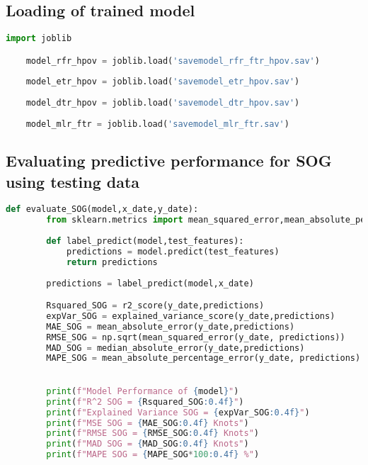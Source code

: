\subsection*{Loading of trained model}

\begin{lstlisting}[language=Python]
    import joblib

    model_rfr_hpov = joblib.load('savemodel_rfr_ftr_hpov.sav')
    
    model_etr_hpov = joblib.load('savemodel_etr_hpov.sav')
    
    model_dtr_hpov = joblib.load('savemodel_dtr_hpov.sav')
    
    model_mlr_ftr = joblib.load('savemodel_mlr_ftr.sav')       
\end{lstlisting}

\subsection*{Evaluating predictive performance for SOG using testing data}

\begin{lstlisting}[language=Python]
    def evaluate_SOG(model,x_date,y_date):
        from sklearn.metrics import mean_squared_error,mean_absolute_percentage_error,r2_score,explained_variance_score,median_absolute_error,mean_absolute_error
        
        def label_predict(model,test_features):
            predictions = model.predict(test_features)
            return predictions
        
        predictions = label_predict(model,x_date)

        Rsquared_SOG = r2_score(y_date,predictions)
        expVar_SOG = explained_variance_score(y_date,predictions)
        MAE_SOG = mean_absolute_error(y_date,predictions)
        RMSE_SOG = np.sqrt(mean_squared_error(y_date, predictions))
        MAD_SOG = median_absolute_error(y_date,predictions)
        MAPE_SOG = mean_absolute_percentage_error(y_date, predictions)
        

        print(f"Model Performance of {model}")
        print(f"R^2 SOG = {Rsquared_SOG:0.4f}")
        print(f"Explained Variance SOG = {expVar_SOG:0.4f}")
        print(f"MSE SOG = {MAE_SOG:0.4f} Knots")    
        print(f"RMSE SOG = {RMSE_SOG:0.4f} Knots")
        print(f"MAD SOG = {MAD_SOG:0.4f} Knots")    
        print(f"MAPE SOG = {MAPE_SOG*100:0.4f} %")     
\end{lstlisting}


